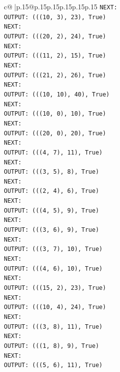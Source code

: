 \documentclass{article}
\begin{document}
{\begin{supertabular}{c@{$\;$}|p{.15\linewidth}@{}p{.15\linewidth}p{.15\linewidth}p{.15\linewidth}p{.15\linewidth}p{.15\linewidth}}
{{{\texttt{NEXT:} \\
\texttt{OUTPUT: (((10, 3), 23), True)} \\
\texttt{NEXT:} \\
\texttt{OUTPUT: (((20, 2), 24), True)} \\
\texttt{NEXT:} \\
\texttt{OUTPUT: (((11, 2), 15), True)} \\
\texttt{NEXT:} \\
\texttt{OUTPUT: (((21, 2), 26), True)} \\
\texttt{NEXT:} \\
\texttt{OUTPUT: (((10, 10), 40), True)} \\
\texttt{NEXT:} \\
\texttt{OUTPUT: (((10, 0), 10), True)} \\
\texttt{NEXT:} \\
\texttt{OUTPUT: (((20, 0), 20), True)} \\
\texttt{NEXT:} \\
\texttt{OUTPUT: (((4, 7), 11), True)} \\
\texttt{NEXT:} \\
\texttt{OUTPUT: (((3, 5), 8), True)} \\
\texttt{NEXT:} \\
\texttt{OUTPUT: (((2, 4), 6), True)} \\
\texttt{NEXT:} \\
\texttt{OUTPUT: (((4, 5), 9), True)} \\
\texttt{NEXT:} \\
\texttt{OUTPUT: (((3, 6), 9), True)} \\
\texttt{NEXT:} \\
\texttt{OUTPUT: (((3, 7), 10), True)} \\
\texttt{NEXT:} \\
\texttt{OUTPUT: (((4, 6), 10), True)} \\
\texttt{NEXT:} \\
\texttt{OUTPUT: (((15, 2), 23), True)} \\
\texttt{NEXT:} \\
\texttt{OUTPUT: (((10, 4), 24), True)} \\
\texttt{NEXT:} \\
\texttt{OUTPUT: (((3, 8), 11), True)} \\
\texttt{NEXT:} \\
\texttt{OUTPUT: (((1, 8), 9), True)} \\
\texttt{NEXT:} \\
\texttt{OUTPUT: (((5, 6), 11), True)} \\
}}}
\end{supertabular}}
\end{document}
